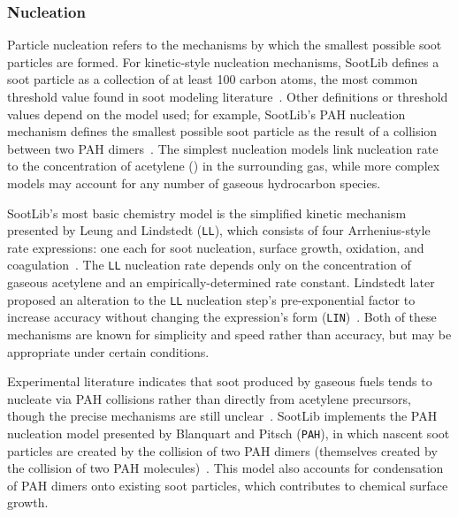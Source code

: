 \documentclass[preprint,letterpaper]{elsarticle}
\begin{document}
\subsubsection{Nucleation}
\label{sss:nuc}

Particle nucleation refers to the mechanisms by which the smallest possible soot particles are formed. For kinetic-style nucleation mechanisms, SootLib defines a soot particle as a collection of at least 100 carbon atoms, the most common threshold value found in soot modeling literature~\cite{Leung_1991}. Other definitions or threshold values depend on the model used; for example, SootLib's PAH nucleation mechanism defines the smallest possible soot particle as the result of a collision between two PAH dimers~\cite{Blanquart_2009c}. The simplest nucleation models link nucleation rate to the concentration of acetylene () in the surrounding gas, while more complex models may account for any number of gaseous hydrocarbon species.

SootLib's most basic chemistry model is the simplified kinetic mechanism presented by Leung and Lindstedt (\texttt{LL}), which consists of four Arrhenius-style rate expressions: one each for soot nucleation, surface growth, oxidation, and coagulation~\cite{Leung_1991}. The \texttt{LL} nucleation rate depends only on the concentration of gaseous acetylene and an empirically-determined rate constant. Lindstedt later proposed an alteration to the \texttt{LL} nucleation step's pre-exponential factor to increase accuracy without changing the expression's form (\texttt{LIN})~\cite{Lindstedt_2005}. Both of these mechanisms are known for simplicity and speed rather than accuracy, but may be appropriate under certain conditions.

Experimental literature indicates that soot produced by gaseous fuels tends to nucleate via PAH collisions rather than directly from acetylene precursors, though the precise mechanisms are still unclear~\cite{Wang_2011}. SootLib implements the PAH nucleation model presented by Blanquart and Pitsch (\texttt{PAH}), in which nascent soot particles are created by the collision of two PAH dimers (themselves created by the collision of two PAH molecules)~\cite{Blanquart_2009c}. This model also accounts for condensation of PAH dimers onto existing soot particles, which contributes to chemical surface growth.

\end{document}
